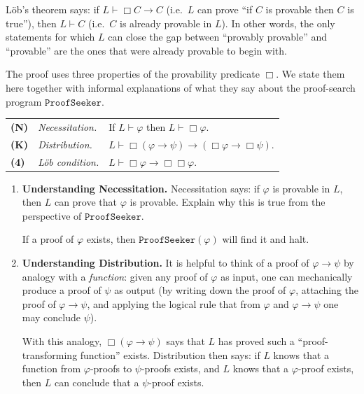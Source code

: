 \documentclass[11pt]{article}
\begin{document}
\begin{exercise}
\label{ex:lob}
\noindent
L\"ob's theorem says: if $L \vdash \Box C \to C$ (i.e.\ $L$ can prove ``if $C$ is
provable then $C$ is true''), then $L \vdash C$ (i.e.\ $C$ is already provable in
$L$). In other words, the only statements for which $L$ can close the gap between
``provably provable'' and ``provable'' are the ones that were already provable to
begin with.

\medskip
\noindent
The proof uses three properties of the provability predicate $\Box$. We state them
here together with informal explanations of what they say about the proof-search
program $\texttt{ProofSeeker}$.

\medskip
\begin{center}
\begin{tabular}{lll}
  \textbf{(N)} & \emph{Necessitation.} & If $L \vdash \varphi$ then
    $L \vdash \Box\varphi$. \\
  \textbf{(K)} & \emph{Distribution.} & $L \vdash \Box(\varphi \to \psi) \to
    (\Box\varphi \to \Box\psi)$. \\
  \textbf{(4)} & \emph{L\"ob condition.} & $L \vdash \Box\varphi \to
    \Box\Box\varphi$.
\end{tabular}
\end{center}

\begin{enumerate}
\item \label{ex:lob-a} \textbf{Understanding Necessitation.} Necessitation says: if $\varphi$ is
provable in $L$, then $L$ can prove that $\varphi$ is provable. Explain why this is
true from the perspective of $\texttt{ProofSeeker}$.

\begin{hint}

If a proof of $\varphi$ exists, then $\texttt{ProofSeeker}(\varphi)$ will
find it and halt.
\end{hint}

\item \label{ex:lob-b} \textbf{Understanding Distribution.} It is helpful to think of a proof of
$\varphi \to \psi$ by analogy with a \emph{function}: given any proof of $\varphi$ as
input, one can mechanically produce a proof of $\psi$ as output (by writing down the
proof of $\varphi$, attaching the proof of $\varphi \to \psi$, and applying the
logical rule that from $\varphi$ and $\varphi \to \psi$ one may conclude $\psi$).

\medskip
\noindent
With this analogy, $\Box(\varphi \to \psi)$ says that $L$ has proved such a
``proof-transforming function'' exists. Distribution then says: if $L$ knows that a
function from $\varphi$-proofs to $\psi$-proofs exists, and $L$ knows that a
$\varphi$-proof exists, then $L$ can conclude that a $\psi$-proof exists.


\end{enumerate}
\end{exercise}
\end{document}
